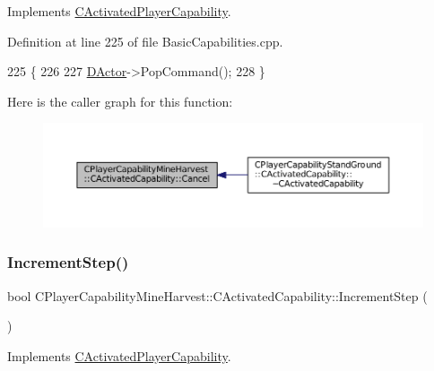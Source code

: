 Implements \hyperlink{classCActivatedPlayerCapability_a5cde83be468e262ad054d81e28684a81}{C\+Activated\+Player\+Capability}.



Definition at line 225 of file Basic\+Capabilities.\+cpp.


\begin{DoxyCode}
225                                                              \{
226 
227     \hyperlink{classCActivatedPlayerCapability_a54ca944b47bff2718330639941d402b0}{DActor}->PopCommand();
228 \}
\end{DoxyCode}
Here is the caller graph for this function\+:\nopagebreak
\begin{figure}[H]
\begin{center}
\leavevmode
\includegraphics[width=350pt]{classCPlayerCapabilityMineHarvest_1_1CActivatedCapability_ab1fef064fbc085a6419b5a822e787614_icgraph}
\end{center}
\end{figure}
\hypertarget{classCPlayerCapabilityMineHarvest_1_1CActivatedCapability_a46dbd6e2ae2fb889da1714c97ed3ca2f}{}\label{classCPlayerCapabilityMineHarvest_1_1CActivatedCapability_a46dbd6e2ae2fb889da1714c97ed3ca2f} 
\subsubsection{\texorpdfstring{Increment\+Step()}{IncrementStep()}}
{\footnotesize\ttfamily bool C\+Player\+Capability\+Mine\+Harvest\+::\+C\+Activated\+Capability\+::\+Increment\+Step (\begin{DoxyParamCaption}{ }\end{DoxyParamCaption})\hspace{0.3cm}{\ttfamily [virtual]}}



Implements \hyperlink{classCActivatedPlayerCapability_a943b5999a57504399293250382c0ec6a}{C\+Activated\+Player\+Capability}.



